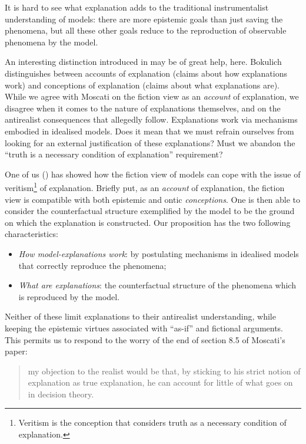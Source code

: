 \documentclass[a4paper,11pt]{article}
\theoremstyle{definition}
\begin{document}
It is hard to see what explanation adds to the traditional instrumentalist understanding of models: there are more epistemic goals than just saving the phenomena, but all these other goals reduce to the reproduction of observable phenomena by the model.

An interesting distinction introduced in \citep{Bokulich2018} may be of great help, here. Bokulich distinguishes between accounts of explanation (claims about how explanations work) and conceptions of explanation (claims about what explanations are). While we agree with Moscati on the fiction view as an \textit{account} of explanation, we disagree when it comes to the nature of explanations themselves, and on the antirealist consequences that allegedly follow. Explanations work via mechanisms embodied in idealised models. Does it mean that we must refrain ourselves from looking for an external justification of these explanations? Must we abandon the ``truth is a necessary condition of explanation'' requirement?

One of us (\citep{Brandelet2023}) has showed how the fiction view of models can cope with the issue of veritism\footnote{Veritism is the conception that considers truth as a necessary condition of explanation.} of explanation. Briefly put, as an \textit{account} of explanation, the fiction view is compatible with both epistemic and ontic \textit{conceptions}. One is then able to consider the counterfactual structure exemplified by the model to be the ground on which the explanation is constructed. Our proposition has the two following characteristics:

\begin{itemize}
    \item \textit{How model-explanations work}: by postulating mechanisms in idealised models that correctly reproduce the phenomena;
    \item \textit{What are explanations}: the counterfactual structure of the phenomena which is reproduced by the model.
\end{itemize}

Neither of these limit explanations to their antirealist understanding, while keeping the epistemic virtues associated with ``as-if'' and fictional arguments. This permits us to respond to the worry of the end of section 8.5 of Moscati's paper:

\begin{quote}
    my objection to the realist would be that, by sticking to his strict notion of explanation as true explanation, he can account for little of what goes on in decision theory. \citep[p.~22]{Moscati2023}
\end{quote}
\end{document}
